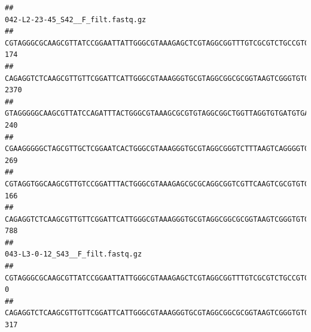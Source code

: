 \documentclass[]{article}
\begin{document}
\begin{verbatim}
##                                                                                                                                                                                                                                                           042-L2-23-45_S42__F_filt.fastq.gz
## CGTAGGGCGCAAGCGTTATCCGGAATTATTGGGCGTAAAGAGCTCGTAGGCGGTTTGTCGCGTCTGCCGTGAAAGTCCGGGGCTCAACTCCGGATCTGCGGTGGGTACGGGCAGACTAGAGTGATGTAGGGGAGACTGGAATTCCTGGTGTAGCGGTGAAATGCGCAGATATCAGGAGGAACACCGATGGCGAAGGCAGGTCTCTGGGCATTAACTGACGCTGAGGAGCGAAAGCATGGGGAGCGAACA                               174
## CAGAGGTCTCAAGCGTTGTTCGGATTCATTGGGCGTAAAGGGTGCGTAGGCGGCGCGGTAAGTCGGGTGTGAAATCTCGGAGCTTAACTCCGAAACTGCATTCGATACTGCCGTGCTTGAGGACTGGAGAGGAGACTGGAATTTACGGTGTAGCGGTGAAATGCGTAGATATCGTAAGGAAGACCAGTGGCGAAGGCGGGTCTCTGGACAGTTCCTGACGCTGAGGCACGAAGGCCAGGGGAGCAAACG                              2370
## GTAGGGGGCAAGCGTTATCCAGATTTACTGGGCGTAAAGCGCGTGTAGGCGGCTGGTTAGGTGTGATGTGAAATCTTCCGGCTCAACCGGAAAACTGCATTGCAAACCGGCCTGGCTAGAGTGCAGGAGAGGGAAGCGGAATTCCAGGTGTAGCGGTGAAATGCGTAGATATCTGGAGGAACACCAGTGGCGAAGGCGGCTTCCTGGCCTGCAACTGACGCTGAGACGCGAAAGCGTGGGGAGCGAAC                                240
## CGAAGGGGGCTAGCGTTGCTCGGAATCACTGGGCGTAAAGGGTGCGTAGGCGGGTCTTTAAGTCAGGGGTGAAATCCTGGAGCTCAACTCCAGAACTGCCTTTGATACTGAAGATCTTGAGTTCGGGAGAGGTGAGTGGAACTGCGAGTGTAGAGGTGAAATTCGTAGATATTCGCAAGAACACCAGTGGCGAAGGCGGCTCACTGGCCCGATACTGACGCTGAGGCACGAAAGCGTGGGGAGCAAACA                               269
## CGTAGGTGGCAAGCGTTGTCCGGATTTACTGGGCGTAAAGAGCGCGCAGGCGGTCGTTCAAGTCGCGTGTGAAAGCCCCCGGCTCAACTGGGGAGGGTCACGCGATACTGATCGACTCGAAGGCAGGAGAGGGTAGTGGAATTCCCGGTGTAGTGGTGAAATGCGTAGATATCGGGAGGAACACCAGTGGCGAAGGCGACTACCTGGCCTGTTCTTGACGCTGAGGCGCGAAAGCTAGGGGAGCAAACG                               166
## CAGAGGTCTCAAGCGTTGTTCGGATTCATTGGGCGTAAAGGGTGCGTAGGCGGCGCGGTAAGTCGGGTGTGAAATCTCGGGGCTTAACTCCGAAACTGCATTCGATACTGCCGTGCTTGAGGACTGGAGAGGAGACTGGAATTTACGGTGTAGCGGTGAAATGCGTAGATATCGTAAGGAAGACCAGTGGCGAAGGCGGGTCTCTGGACAGTTCCTGACGCTGAGGCACGAAGGCCAGGGGAGCAAACG                               788
##                                                                                                                                                                                                                                                           043-L3-0-12_S43__F_filt.fastq.gz
## CGTAGGGCGCAAGCGTTATCCGGAATTATTGGGCGTAAAGAGCTCGTAGGCGGTTTGTCGCGTCTGCCGTGAAAGTCCGGGGCTCAACTCCGGATCTGCGGTGGGTACGGGCAGACTAGAGTGATGTAGGGGAGACTGGAATTCCTGGTGTAGCGGTGAAATGCGCAGATATCAGGAGGAACACCGATGGCGAAGGCAGGTCTCTGGGCATTAACTGACGCTGAGGAGCGAAAGCATGGGGAGCGAACA                                0
## CAGAGGTCTCAAGCGTTGTTCGGATTCATTGGGCGTAAAGGGTGCGTAGGCGGCGCGGTAAGTCGGGTGTGAAATCTCGGAGCTTAACTCCGAAACTGCATTCGATACTGCCGTGCTTGAGGACTGGAGAGGAGACTGGAATTTACGGTGTAGCGGTGAAATGCGTAGATATCGTAAGGAAGACCAGTGGCGAAGGCGGGTCTCTGGACAGTTCCTGACGCTGAGGCACGAAGGCCAGGGGAGCAAACG                              317

\end{verbatim}
\end{document}

